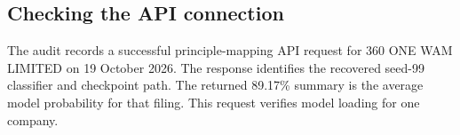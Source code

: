 \subsection{Checking the API connection}

The audit records a successful principle-mapping API request for 360 ONE WAM LIMITED on 19 October 2026. The response identifies the recovered seed-99 classifier and checkpoint path. The returned 89.17\% summary is the average model probability for that filing. This request verifies model loading for one company.

\FloatBarrier